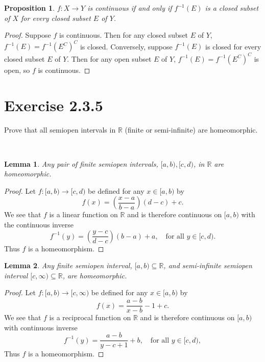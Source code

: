 \documentclass[12pt]{article}
\newtheorem{lemma}{Lemma}
\newtheorem{proposition}{Proposition}
\newenvironment{problem}
    {\begin{lrbox}{\mybox}\begin{minipage}{\textwidth-10pt}}
    {\end{minipage}\end{lrbox}\framebox[6.5in]{\usebox{\mybox}}\\}
\newcommand{\R}{\mathbb{R}}
\begin{document}
\begin{proposition}
    $f:X\to Y$ is continuous if and only if $f^{-1}(E)$ is a closed subset of $X$ for every closed subset $E$ of $Y$.
\end{proposition}

\begin{proof}
    Suppose $f$ is continuous. Then for any closed subset $E$ of $Y$, $f^{-1}(E) = f^{-1}(E^C)^C$ is closed. Conversely, suppose $f^{-1}(E)$ is closed for every closed subset $E$ of $Y$. Then for any open subset $E$ of $Y$, $f^{-1}(E) = f^{-1}(E^C)^C$ is open, so $f$ is continuous.
    
\end{proof}

\section*{Exercise 2.3.5}
\begin{problem}
    Prove that all semiopen intervals in $\R$ (finite or semi-infinite) are homeomorphic.
\end{problem}

\begin{lemma}\label{145-01 both finite}
    Any pair of finite semiopen intervals, $[a,b), [c,d)$, in $\R$ are homeomorphic.
\end{lemma}

\begin{proof}
    Let $f:[a,b) \to [c,d)$ be defined for any $x\in[a,b)$ by
    \[f(x) = \left(\frac{x-a}{b-a}\right)(d-c) + c.\]
    We see that $f$ is a linear function on $\R$ and is therefore continuous on $[a,b)$ with the continuous inverse
    \[f^{-1}(y) = \left(\frac{y-c}{d-c}\right)(b-a) + a, \quad\text{for all } y\in[c,d).\]
    Thus $f$ is a homeomorphism.
\end{proof}

\begin{lemma}
    Any finite semiopen interval, $[a,b)\subseteq\R$, and semi-infinite semiopen interval $[c,\infty)\subseteq\R$, are homeomorphic.
\end{lemma}

\begin{proof}
    Let $f:[a,b) \to [c,\infty)$ be defined for any $x\in[a,b)$ by
    \[f(x) = \frac{a-b}{x-b} - 1 + c.\]
    We see that $f$ is a reciprocal function on $\R$ and is therefore continuous on $[a,b)$ with continuous inverse
    \[f^{-1}(y) = \frac{a-b}{y-c+1} + b, \quad\text{for all } y\in[c,d),\]
    Thus $f$ is a homeomorphism.
\end{proof}
\end{document}
